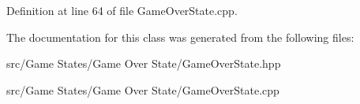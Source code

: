 Definition at line 64 of file Game\+Over\+State.\+cpp.


\begin{DoxyCode}{0}

\end{DoxyCode}


The documentation for this class was generated from the following files\+:\begin{DoxyCompactItemize}
\item 
src/\+Game States/\+Game Over State/Game\+Over\+State.\+hpp\item 
src/\+Game States/\+Game Over State/Game\+Over\+State.\+cpp\end{DoxyCompactItemize}
